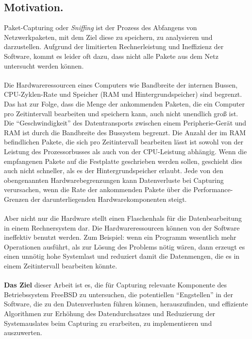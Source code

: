 \subsection{Motivation.}
Paket-Capturing oder \emph{Sniffing} ist der Prozess des Abfangens von
Netzwerkpaketen, mit dem Ziel diese zu speichern, zu analysieren und
darzustellen. Aufgrund der limitierten Rechnerleistung und Ineffizienz der
Software, kommt es leider oft dazu, dass nicht alle Pakete aus dem Netz
untersucht werden können.  \\\\
Die Hardwareressourcen eines Computers wie Bandbreite der internen Bussen,
CPU-Zyklen-Rate und Speicher (RAM und Hintergrundspeicher) sind begrenzt. Das
hat zur Folge, dass die Menge der ankommenden Paketen, die ein Computer pro
Zeitintervall bearbeiten und speichern kann, auch nicht unendlich groß ist.
Die ``Geschwindigkeit'' des Datentransports zwischen einem  Peripherie-Gerät
und RAM  ist durch die Bandbreite des Bussystem begrenzt. Die Anzahl der im RAM
befindlichen Pakete, die sich pro Zeitintervall bearbeiten lässt ist sowohl von
der Leistung  des Prozessorbusses als auch von der CPU-Leistung abhängig. Wenn
die empfangenen Pakete auf die Festplatte geschrieben werden sollen, geschieht
dies auch nicht schneller, als es der Hintergrundspeicher erlaubt. Jede von den
obengenannten Hardwarebegrenzungen kann Datenverluste bei Capturing
verursachen, wenn die Rate der ankommenden Pakete über die Performance-Grenzen
der darunterliegenden Hardwarekomponenten steigt.  \\\\
Aber nicht nur die Hardware stellt einen Flaschenhals für die Datenbearbeitung
in einem Rechnersystem dar. Die Hardwareressourcen können von der Software
ineffektiv benutzt werden. Zum Beispiel: wenn ein Programm wesentlich mehr
Operationen ausführt, als zur Lösung des Problems nötig wären, dann erzeugt es
einen unnötig hohe Systemlast und reduziert damit die Datenmengen, die es in
einem Zeitintervall bearbeiten könnte.  \\\\
%
\textbf{Das Ziel} dieser Arbeit ist es, die für Capturing relevante Komponente des
Betriebssystem FreeBSD zu untersuchen, die potentiellen ``Engstellen'' in der
Software, die zu den Datenverlusten führen können,  herauszufinden, und
effiziente Algorithmen zur Erhöhung des Datendurchsatzes und Reduzierung der
Systemauslates beim Capturing zu erarbeiten, zu implementieren und auszuwerten.
